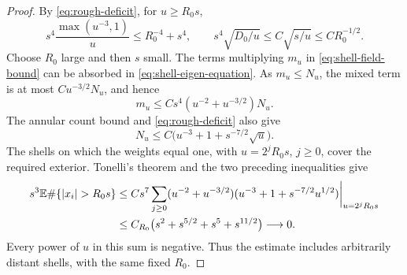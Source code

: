 \begin{proof}
By \cref{eq:rough-deficit}, for $u\ge R_0s$,
\[
 s^4\frac{\max(u^{-3},1)}u\le R_0^{-4}+s^4,
 \qquad
 s^4\sqrt{D_0/u}\le C\sqrt{s/u}\le CR_0^{-1/2}.
\]
Choose $R_0$ large and then $s$ small.  The terms multiplying $m_u$ in
\cref{eq:shell-field-bound} can be absorbed in
\cref{eq:shell-eigen-equation}.  As $m_u\le N_u$, the mixed term is at
most $Cu^{-3/2}N_u$, and hence
\[
 m_u\le Cs^4(u^{-2}+u^{-3/2})N_u.
\]
The annular count bound and \cref{eq:rough-deficit} also give
\[
 N_u\le C\bigl(u^{-3}+1+s^{-7/2}\sqrt u\bigr).
\]
The shells on which the weights equal one, with
$u=2^jR_0s$, $j\ge0$, cover the required exterior.  Tonelli's theorem and
the two preceding inequalities give
\begin{align*}
 s^3\E\#\{|x_i|>R_0s\}
 &\le C s^7\sum_{j\ge0}
       (u^{-2}+u^{-3/2})(u^{-3}+1+s^{-7/2}u^{1/2})
       \bigg|_{u=2^jR_0s}\\
 &\le C_{R_0}
       \bigl(s^2+s^{5/2}+s^5+s^{11/2}\bigr)
       \longrightarrow0.
\end{align*}
Every power of $u$ in this sum is negative.  Thus the estimate includes
arbitrarily distant shells, with the same fixed $R_0$.
\end{proof}
